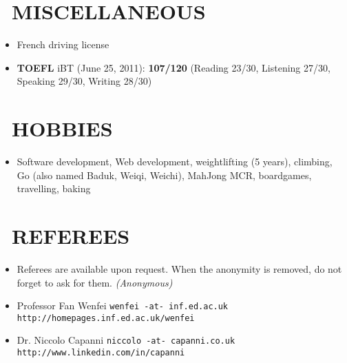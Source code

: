 \documentclass{res}
\begin{document}
\begin{resume}
\section{\faMagic~MISCELLANEOUS}
        \begin{itemize}
                \item[] French driving license
                \item[] \textbf{TOEFL} iBT (June 25, 2011): \textbf{107/120} (Reading 23/30, Listening 27/30, Speaking 29/30, Writing 28/30)
                    \end{itemize} 
 
\section{\faGamepad~HOBBIES}
        \begin{itemize}
                \item[] Software development, Web development, weightlifting (5 years), climbing, Go (also named Baduk, Weiqi, Weichi), MahJong MCR, boardgames, travelling, baking
        \end{itemize}

\section{\faUserCheck~REFEREES}
\ifisanon 
     \begin{itemize}
         \item[] Referees are available upon request. When the anonymity is removed, do not forget to ask for them. \textit{(Anonymous)}
     \end{itemize}
\else
                \begin{itemize}
                        \item[] Professor Fan Wenfei \tabto{5cm} \texttt{wenfei -at- inf.ed.ac.uk} \hfill \texttt{http://homepages.inf.ed.ac.uk/wenfei}
                        \item[] Dr. Niccolo Capanni \tabto{5cm} \texttt{niccolo -at- capanni.co.uk} \hfill \texttt{http://www.linkedin.com/in/capanni}
                \end{itemize}
\fi
\end{resume} 
\end{document}
